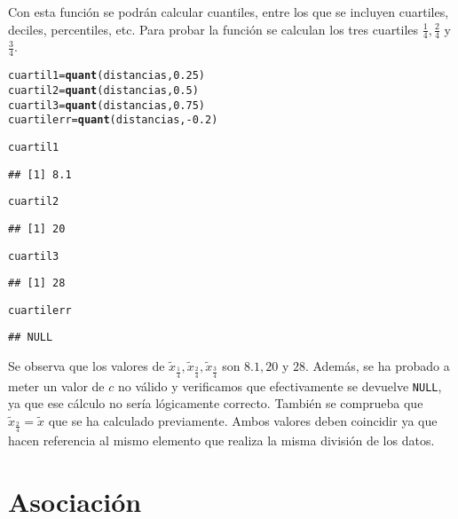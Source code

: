 \documentclass[12pt]{report}\usepackage[]{graphicx}\usepackage[dvipsnames]{xcolor}
\makeatletter
\newcommand{\hlnum}[1]{\textcolor[rgb]{0.686,0.059,0.569}{#1}}%
\newcommand{\hlopt}[1]{\textcolor[rgb]{0,0,0}{#1}}%
\newcommand{\hlstd}[1]{\textcolor[rgb]{0.345,0.345,0.345}{#1}}%
\newcommand{\hlkwb}[1]{\textcolor[rgb]{0.69,0.353,0.396}{#1}}%
\newcommand{\hlkwd}[1]{\textcolor[rgb]{0.737,0.353,0.396}{\textbf{#1}}}%
\newenvironment{kframe}{%
 \def\at@end@of@kframe{}%
 \ifinner\ifhmode%
  \def\at@end@of@kframe{\end{minipage}}%
  \begin{minipage}{\columnwidth}%
 \fi\fi%
 \def\FrameCommand##1{\hskip\@totalleftmargin \hskip-\fboxsep
 \colorbox{shadecolor}{##1}\hskip-\fboxsep
     \hskip-\linewidth \hskip-\@totalleftmargin \hskip\columnwidth}%
 \MakeFramed {\advance\hsize-\width
   \@totalleftmargin\z@ \linewidth\hsize
   \@setminipage}}%
 {\par\unskip\endMakeFramed%
 \at@end@of@kframe}
\newenvironment{knitrout}{}{} %
\makeatother
\begin{document}
			Con esta función se podrán calcular cuantiles, entre los que se incluyen cuartiles, deciles, percentiles, etc. Para probar la función se calculan los tres cuartiles $\frac{1}{4}, \frac{2}{4}$ y $\frac{3}{4}$.
			
\begin{knitrout}
\color{fgcolor}\begin{kframe}
\begin{alltt}
\hlstd{cuartil1} \hlkwb{=} \hlkwd{quant}\hlstd{(distancias,}\hlnum{0.25}\hlstd{)}
\hlstd{cuartil2} \hlkwb{=} \hlkwd{quant}\hlstd{(distancias,}\hlnum{0.5}\hlstd{)}
\hlstd{cuartil3} \hlkwb{=} \hlkwd{quant}\hlstd{(distancias,}\hlnum{0.75}\hlstd{)}
\hlstd{cuartilerr} \hlkwb{=} \hlkwd{quant}\hlstd{(distancias,} \hlopt{-}\hlnum{0.2}\hlstd{)}

\hlstd{cuartil1}
\end{alltt}
\begin{verbatim}
## [1] 8.1
\end{verbatim}
\begin{alltt}
\hlstd{cuartil2}
\end{alltt}
\begin{verbatim}
## [1] 20
\end{verbatim}
\begin{alltt}
\hlstd{cuartil3}
\end{alltt}
\begin{verbatim}
## [1] 28
\end{verbatim}
\begin{alltt}
\hlstd{cuartilerr}
\end{alltt}
\begin{verbatim}
## NULL
\end{verbatim}
\end{kframe}
\end{knitrout}
			
			Se observa que los valores de $\tilde{x}_{\frac{1}{4}}, \tilde{x}_{\frac{2}{4}}, \tilde{x}_{\frac{3}{4}}$ son $8.1, 20$ y $28$. Además, se ha probado a meter un valor de $c$ no válido y verificamos que efectivamente se devuelve \texttt{NULL}, ya que ese cálculo no sería lógicamente correcto. También se comprueba que $\tilde{x}_{\frac{2}{4}} = \tilde{x}$ que se ha calculado previamente. Ambos valores deben coincidir ya que hacen referencia al mismo elemento que realiza la misma división de los datos.
			
		\section{Asociación}
		
\end{document}
